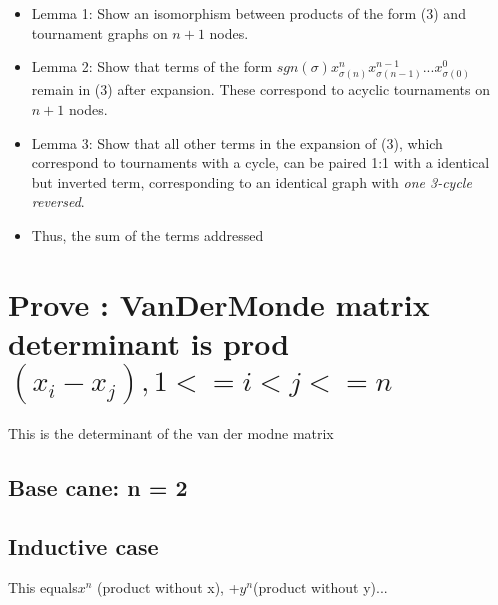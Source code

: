 \documentclass[11pt, oneside]{article} 	%
\begin{document}
\begin{itemize}
\item Lemma 1: Show an isomorphism between products of the form (3) and tournament graphs on $n+1$ nodes.
\item Lemma 2: Show that terms of the form $sgn(\sigma) x_{\sigma(n)}^n x_{\sigma(n-1)}^{n-1} ... x_{\sigma(0)}^{0} $ remain in (3) after expansion.  These correspond to acyclic tournaments on $n+1$ nodes.
\item Lemma 3: Show that all other terms in the expansion of (3), which correspond to tournaments with a cycle, can be paired 1:1 with a identical but inverted term, corresponding to an identical graph with \emph{one 3-cycle reversed}.
\item Thus, the sum of the terms addressed 
\end{itemize}

\section{Prove : VanDerMonde matrix determinant is prod $(x_i - x_j), 1 <= i < j <= n$}
 This is the determinant of the van der modne matrix
\subsection{Base cane: n = 2}
\subsection{Inductive case} This equals$ x^n$ (product without x), +$ y^n $(product without y)...
\begin{comment}
- Represent as a graph tournament, n nodes, (n choose 2) edges.  There are 2^(n choose 2) possibilities.
- Each term (+/-) x_0^a_0*x_1^a_1...*x_n^a_n, where sum a_i = (n choose 2), represents one possible tournament on a directed complete graph of size n
- If there are no cycles in a given tournamnet
  - then it's of the form b^n c^n-1 ... x^1 y^0 for some b,c,...y in x_i.
- If there are ctycles in a tournament
  - Any even cycle implies an odd cycle (quick proof)
  - Therfore there's an odd cycle
  - Reversing an odd cycle produces a different graph with an odd cycle and flipped sign.
- For a tournament config that is NOT a topo sort (has a cycle)
  - There are as many positivies as negatives (PROVE?)
  - So the terms cancel out
  - Therefore everything is of the form b^n c^n-1 ... x^1 y^0
  - So big product up to n is x^n(prodcut without x) + y^n(product without y..).
*** This is zero if and only if x_i = x_j for some
*** Therefore, only one solution for n distinct points on a polynomial of size n.

\end{comment}
\end{document}
